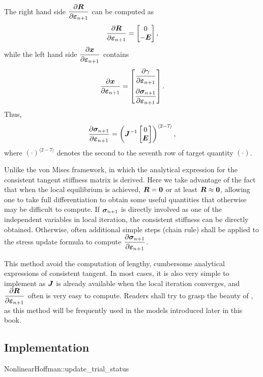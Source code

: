 The right hand side $\dfrac{\partial{\bm{R}}}{\partial{\bm{\varepsilon}_{n+1}}}$ can be computed as
\begin{gather}
\dfrac{\partial{\bm{R}}}{\partial{\bm{\varepsilon}_{n+1}}}=\begin{bmatrix}
0\\
-\bm{E}
\end{bmatrix},
\end{gather}
while the left hand side $\dfrac{\partial{\bm{x}}}{\partial{\bm{\varepsilon}_{n+1}}}$ contains
\begin{gather}
\dfrac{\partial{\bm{x}}}{\partial{\bm{\varepsilon}_{n+1}}}=\begin{bmatrix}
\dfrac{\partial{\gamma}}{\partial{\bm{\varepsilon}_{n+1}}}\\[4mm]
\dfrac{\partial{\bm{\sigma}_{n+1}}}{\partial{\bm{\varepsilon}_{n+1}}}
\end{bmatrix}.
\end{gather}
Thus,
\begin{gather}
\dfrac{\partial{\bm{\sigma}_{n+1}}}{\partial{\bm{\varepsilon}_{n+1}}}=\left(\bm{J}^{-1}\begin{bmatrix}
0\\
\bm{E}
\end{bmatrix}\right)^{\langle2-7\rangle},
\end{gather}
where $\left(\cdot\right)^{\langle2-7\rangle}$ denotes the second to the seventh row of target quantity $\left(\cdot\right)$.

Unlike the von Mises framework, in which the analytical expression for the consistent tangent stiffness matrix is derived. Here we take advantage of the fact that when the local equilibrium is achieved, $\bm{R}=\bm{0}$ or at least $\bm{R}\approx\bm{0}$, allowing one to take full differentiation to obtain some useful quantities that otherwise may be difficult to compute. If $\bm{\sigma}_{n+1}$ is directly involved as one of the independent variables in local iteration, the consistent stiffness can be directly obtained. Otherwise, often additional simple steps (chain rule) shall be applied to the stress update formula to compute $\dfrac{\partial{\bm{\sigma}_{n+1}}}{\partial{\bm{\varepsilon}_{n+1}}}$.

This method avoid the computation of lengthy, cumbersome analytical expressions of consistent tangent. In most cases, it is also very simple to implement as $\bm{J}$ is already available when the local iteration converges, and $\dfrac{\partial{\bm{R}}}{\partial{\bm{\varepsilon}_{n+1}}}$ often is very easy to compute. Readers shall try to grasp the beauty of , as this method will be frequently used in the models introduced later in this book.
\subsection{Implementation}
\begin{cppcode}
NonlinearHoffman::update_trial_status
\end{cppcode}